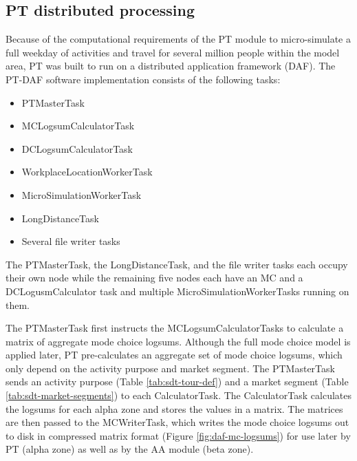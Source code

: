 \subsection{PT distributed processing}
Because of the computational requirements of the PT module to micro-simulate a full weekday of activities and travel for several million people within the model area, PT was built to run on a distributed application framework (DAF). The PT-DAF software implementation consists of the following tasks:
\begin{itemize}
\item PTMasterTask
\item MCLogsumCalculatorTask
\item DCLogsumCalculatorTask
\item WorkplaceLocationWorkerTask
\item MicroSimulationWorkerTask
\item LongDistanceTask 
\item Several file writer tasks  
\end{itemize}

\noindent The PTMasterTask, the LongDistanceTask, and the file writer tasks each occupy their own node while the remaining five nodes each have an MC and a DCLogusmCalculator task and multiple MicroSimulationWorkerTasks running on them. 

The PTMasterTask first instructs the MCLogsumCalculatorTasks to calculate a matrix of aggregate mode choice logsums. Although the full mode choice model is applied later, PT pre-calculates an aggregate set of mode choice logsums, which only depend on the activity purpose and market segment. The PTMasterTask sends an activity purpose (Table \ref{tab:sdt-tour-def}) and a market segment (Table \ref{tab:sdt-market-segments}) to each CalculatorTask. The CalculatorTask calculates the logsums for each alpha zone and stores the values in a matrix. The matrices are then passed to the MCWriterTask, which writes the mode choice logsums out to disk in compressed matrix format (Figure \ref{fig:daf-mc-logsums}) for use later by PT (alpha zone) as well as by the AA module (beta zone). 

